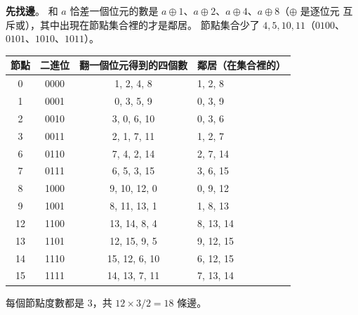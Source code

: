 \begin{pastsoln}
\textbf{先找邊}。 和 $a$ 恰差一個位元的數是 $a \oplus 1$、$a \oplus 2$、$a \oplus 4$、$a \oplus 8$（$\oplus$ 是逐位元
互斥或），其中出現在節點集合裡的才是鄰居。 節點集合少了 $4, 5, 10, 11$（$0100$、$0101$、$1010$、$1011$）。
\begin{center}
\small
\begin{tabular}{cccl}
\toprule
節點 & 二進位 & 翻一個位元得到的四個數 & 鄰居（在集合裡的） \\
\midrule
0 & 0000 & 1, 2, 4, 8 & 1, 2, 8 \\
1 & 0001 & 0, 3, 5, 9 & 0, 3, 9 \\
2 & 0010 & 3, 0, 6, 10 & 0, 3, 6 \\
3 & 0011 & 2, 1, 7, 11 & 1, 2, 7 \\
6 & 0110 & 7, 4, 2, 14 & 2, 7, 14 \\
7 & 0111 & 6, 5, 3, 15 & 3, 6, 15 \\
8 & 1000 & 9, 10, 12, 0 & 0, 9, 12 \\
9 & 1001 & 8, 11, 13, 1 & 1, 8, 13 \\
12 & 1100 & 13, 14, 8, 4 & 8, 13, 14 \\
13 & 1101 & 12, 15, 9, 5 & 9, 12, 15 \\
14 & 1110 & 15, 12, 6, 10 & 6, 12, 15 \\
15 & 1111 & 14, 13, 7, 11 & 7, 13, 14 \\
\bottomrule
\end{tabular}
\end{center}
每個節點度數都是 $3$，共 $12 \times 3 / 2 = 18$ 條邊。


\end{pastsoln}
